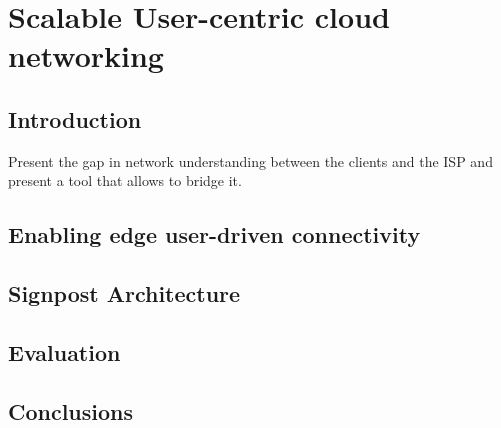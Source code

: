 \chapter{Scalable User-centric cloud networking}
\ifpdf
    \graphicspath{{Chapter3/Chapter3Figs/PNG/}{Chapter3/Chapter3Figs/PDF/}{Chapter3/Chapter3Figs/}}
\else
    \graphicspath{{Chapter3/Chapter3Figs/EPS/}{Chapter3/Chapter3Figs/}}
\fi

\section{Introduction}

Present the gap in network understanding between the clients and the ISP and
present a tool that allows to bridge it.

\section{Enabling edge user-driven connectivity}

\section{Signpost Architecture}

\section{Evaluation}

\section{Conclusions}
%
%
%


